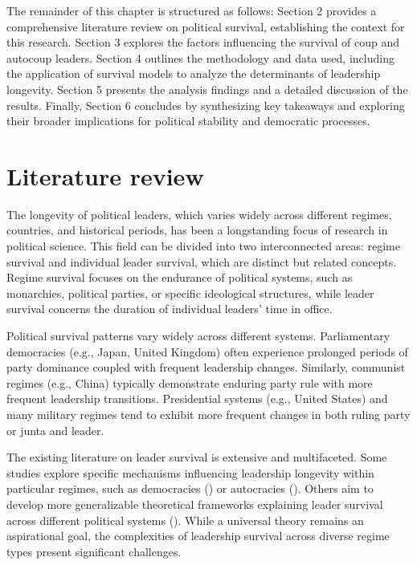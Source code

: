 \documentclass[
  12pt,
]{report}
\begin{document}
The remainder of this chapter is structured as follows: Section 2
provides a comprehensive literature review on political survival,
establishing the context for this research. Section 3 explores the
factors influencing the survival of coup and autocoup leaders. Section 4
outlines the methodology and data used, including the application of
survival models to analyze the determinants of leadership longevity.
Section 5 presents the analysis findings and a detailed discussion of
the results. Finally, Section 6 concludes by synthesizing key takeaways
and exploring their broader implications for political stability and
democratic processes.

\section{Literature review}\label{literature-review}

The longevity of political leaders, which varies widely across different
regimes, countries, and historical periods, has been a longstanding
focus of research in political science. This field can be divided into
two interconnected areas: regime survival and individual leader
survival, which are distinct but related concepts. Regime survival
focuses on the endurance of political systems, such as monarchies,
political parties, or specific ideological structures, while leader
survival concerns the duration of individual leaders' time in office.

Political survival patterns vary widely across different systems.
Parliamentary democracies (e.g., Japan, United Kingdom) often experience
prolonged periods of party dominance coupled with frequent leadership
changes. Similarly, communist regimes (e.g., China) typically
demonstrate enduring party rule with more frequent leadership
transitions. Presidential systems (e.g., United States) and many
military regimes tend to exhibit more frequent changes in both ruling
party or junta and leader.

The existing literature on leader survival is extensive and
multifaceted. Some studies explore specific mechanisms influencing
leadership longevity within particular regimes, such as democracies
() or autocracies
(). Others aim to develop more generalizable theoretical frameworks
explaining leader survival across different political systems
().
While a universal theory remains an aspirational goal, the complexities
of leadership survival across diverse regime types present significant
challenges.
\end{document}
